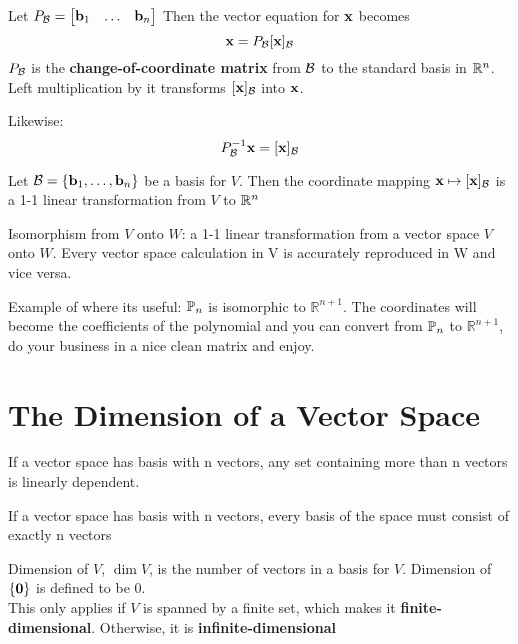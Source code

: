 \documentclass{report}
\begin{document}
Let $P_{\mathcal{B}} = \begin{bmatrix}
    \mathbf{b}_1 & \ldots & \mathbf{b}_n
\end{bmatrix} $
Then the vector equation for $\mathbf{x}$ becomes \[
\mathbf{x} = P_{\mathcal{B}} [\mathbf{x}]_{\mathcal{B}}
\]
$P_{\mathcal{B}}$ is the \textbf{change-of-coordinate matrix} from $\mathcal{B}$ to the standard basis in $\mathbb{R}^n$. Left
multiplication by it transforms $[\mathbf{x}]_{\mathcal{B}}$ into $\mathbf{x}$.


Likewise:\[
P_{\mathcal{B}}^{-1} \mathbf{x} = [\mathbf{x}]_{\mathcal{B}}
\]

\begin{theorem}
    Let $\mathcal{B} = \{\mathbf{b}_1, \ldots, \mathbf{b}_n\}$ be a basis for $V$. Then the coordinate 
    mapping $\mathbf{x} \mapsto [\mathbf{x}]_{\mathcal{B}}$ is a 1-1 linear transformation from $V$ to $\mathbb{R}^n$
\end{theorem}

\begin{definition}
    Isomorphism from $V$ onto $W$: a 1-1 linear transformation from a vector space
    $V$ onto $W$. Every vector space calculation in V is accurately reproduced in W
    and vice versa.
\end{definition}
Example of where its useful: $\mathbb{P}_n$ is isomorphic to $\mathbb{R}^{n+1}$.
The coordinates will become the coefficients of the polynomial and you can 
convert from $\mathbb{P}_n$ to $\mathbb{R}^{n+1}$, do your business in a nice
clean matrix and enjoy.

\section{The Dimension of a Vector Space}

\begin{theorem}
    If a vector space has basis with n vectors, any set containing more than 
    n vectors is linearly dependent.
\end{theorem}

\begin{theorem}
    If a vector space has basis with n vectors, every basis of the space must consist
    of exactly n vectors
\end{theorem}

\begin{definition}
    Dimension of $V$, $\dim V$, is the number of vectors in a basis for $V$. 
    Dimension of $\{\mathbf{0}\}$ is defined to be $0$. \\
    This only applies if $V$ is spanned by a finite set, 
    which makes it \textbf{finite-dimensional}. Otherwise, it is
    \textbf{infinite-dimensional}
\end{definition}
\end{document}
